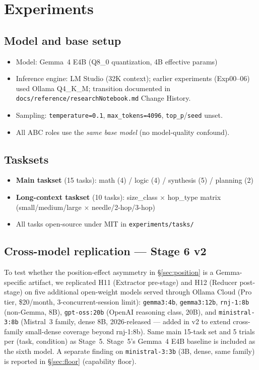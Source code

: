 \documentclass[11pt]{article}
\newcommand{\code}[1]{\texttt{#1}}
\begin{document}
\section{Experiments}

\subsection{Model and base setup}
\begin{itemize}[leftmargin=*,itemsep=2pt]
\item Model: Gemma~4 E4B (Q8\_0 quantization, 4B effective params)
\item Inference engine: LM Studio (32K context); earlier experiments (Exp00--06) used Ollama Q4\_K\_M; transition documented in \code{docs/reference/researchNotebook.md} Change History.
\item Sampling: \code{temperature=0.1}, \code{max\_tokens=4096}, \code{top\_p}/\code{seed} unset.
\item All ABC roles use the \emph{same base model} (no model-quality confound).
\end{itemize}

\subsection{Tasksets}
\begin{itemize}[leftmargin=*,itemsep=2pt]
\item \textbf{Main taskset} (15 tasks): math (4) / logic (4) / synthesis (5) / planning (2)
\item \textbf{Long-context taskset} (10 tasks): size\_class $\times$ hop\_type matrix (small/medium/large $\times$ needle/2-hop/3-hop)
\item All tasks open-source under MIT in \code{experiments/tasks/}
\end{itemize}

\subsection{Cross-model replication --- Stage 6 v2}\label{sec:cross-model}

To test whether the position-effect asymmetry in \S\ref{sec:position} is a Gemma-specific artifact, we replicated H11 (Extractor pre-stage) and H12 (Reducer post-stage) on five additional open-weight models served through Ollama Cloud (Pro tier, \$20/month, 3-concurrent-session limit): \code{gemma3:4b}, \code{gemma3:12b}, \code{rnj-1:8b} (non-Gemma, 8B), \code{gpt-oss:20b} (OpenAI reasoning class, 20B), and \code{ministral-3:8b} (Mistral~3 family, dense 8B, 2026-released --- added in v2 to extend cross-family small-dense coverage beyond rnj-1:8b). Same main 15-task set and 5 trials per (task, condition) as Stage~5. Stage~5's Gemma~4 E4B baseline is included as the sixth model. A separate finding on \code{ministral-3:3b} (3B, dense, same family) is reported in \S\ref{sec:floor} (capability floor).
\end{document}

